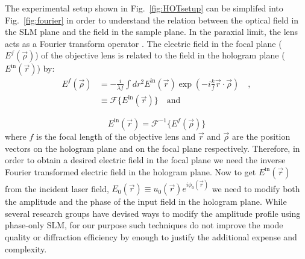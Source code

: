 The experimental setup shown in Fig.~\ref{fig:HOTsetup} can be simplifed into Fig.~\ref{fig:fourier} in order to understand the relation between the optical field in the SLM plane and the field in the sample plane. In the paraxial limit, the lens acts as a Fourier transform operator \cite{goodmanfourier}. The electric field in the focal plane ($E^{f}(\vec{\rho})$) of the objective lens is related to the field in the hologram plane ($E^{\mathrm{in}}(\vec{r})$) by:
\begin{subequations}
\label{eq:fourier_relation}
\begin{align}
        E^{f}(\vec{\rho}) & = -\frac{i}{\lambda f} \int dr^{2} E^{\mathrm{in}}(\vec{r}) \exp \left(-i\frac{k}{f}\vec{r}\cdot \vec{\rho}\right) \quad , \\
 & \equiv \mathcal{F} \lbrace E^{\mathrm{in}}(\vec{r}) \rbrace \quad \mathrm{and}
\end{align}
\end{subequations}

\begin{equation}
\label{eq:inversefourier}
E^{\mathrm{in}}(\vec{r})   = \mathcal{F}^{-1}\lbrace E^{f}(\vec{\rho})\rbrace
\end{equation}
where $f$ is the focal length of the objective lens and $\vec{r}$ and $\vec{\rho}$ are the position vectors on the hologram plane and on the focal plane respectively. Therefore, in order to obtain a desired electric field in the focal plane we need the inverse Fourier transformed electric field in the hologram plane. Now to get $E^{\mathrm{in}}(\vec{r})$ from the incident laser field, $E_{0}(\vec{r})\equiv u_{0}(\vec{r})e^{i\phi _{0}(\vec{r})}$ we need to modify both the amplitude and the phase of the input field in the hologram plane. While several research groups have devised ways to modify the amplitude profile \cite{Ando:09, Bagnoud:04, Liu:14, Wilson:07, vanPutten:08, zhu2014} using phase-only SLM, for our purpose such techniques do not improve the mode quality or diffraction efficiency by enough to justify the additional expense and complexity. 

